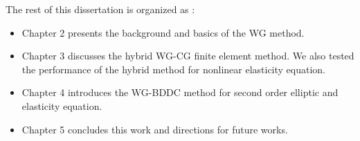 The rest of this dissertation is organized as :

\begin{itemize}
	\item Chapter 2 presents the background and basics of the WG method.
	\item Chapter 3 discusses the hybrid WG-CG finite element method. We also tested the performance of the hybrid method for nonlinear elasticity equation.
	\item Chapter 4 introduces the WG-BDDC method for second order elliptic and elasticity equation.
	\item Chapter 5 concludes this work and directions for future works.
\end{itemize}
